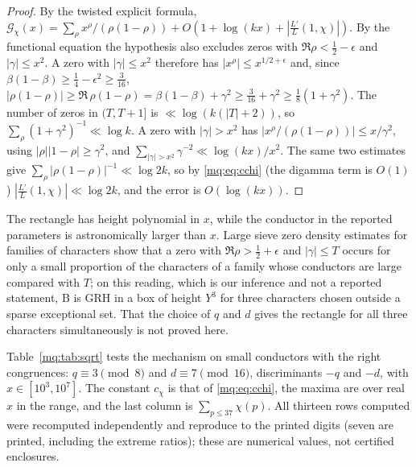 \begin{proof}
By the twisted explicit formula, $\mathcal G_\chi(x)=\sum_{\rho}x^\rho/(\rho(1-\rho))+O(1+\log(kx)+|\frac{L'}L(1,\chi)|)$. By the functional equation the hypothesis also excludes zeros with $\Re\rho<\frac12-\epsilon$ and $|\gamma|\le x^2$. A zero with $|\gamma|\le x^2$ therefore has $|x^\rho|\le x^{1/2+\epsilon}$ and, since $\beta(1-\beta)\ge\frac14-\epsilon^2\ge\frac3{16}$, $|\rho(1-\rho)|\ge\Re\,\rho(1-\rho)=\beta(1-\beta)+\gamma^2\ge\frac3{16}+\gamma^2\ge\frac18(1+\gamma^2)$. The number of zeros in $(T,T+1]$ is $\ll\log(k(|T|+2))$, so $\sum_\rho(1+\gamma^2)^{-1}\ll\log k$. A zero with $|\gamma|>x^2$ has $|x^\rho/(\rho(1-\rho))|\le x/\gamma^2$, using $|\rho||1-\rho|\ge\gamma^2$, and $\sum_{|\gamma|>x^2}\gamma^{-2}\ll\log(kx)/x^2$. The same two estimates give $\sum_\rho|\rho(1-\rho)|^{-1}\ll\log2k$, so by \eqref{mq:eq:cchi} (the digamma term is $O(1)$) $|\frac{L'}L(1,\chi)|\ll\log2k$, and the error is $O(\log(kx))$.
\end{proof}

The rectangle has height polynomial in $x$, while the conductor in the reported parameters is astronomically larger than $x$. Large sieve zero density estimates for families of characters show that a zero with $\Re\rho>\frac12+\epsilon$ and $|\gamma|\le T$ occurs for only a small proportion of the characters of a family whose conductors are large compared with $T$; on this reading, which is our inference and not a reported statement, B is GRH in a box of height $Y^3$ for three characters chosen outside a sparse exceptional set. That the choice of $q$ and $d$ gives the rectangle for all three characters simultaneously is not proved here.

Table~\ref{mq:tab:sqrt} tests the mechanism on small conductors with the right congruences: $q\equiv3\pmod 8$ and $d\equiv7\pmod{16}$, discriminants $-q$ and $-d$, with $x\in[10^3,10^7]$. The constant $c_\chi$ is that of \eqref{mq:eq:cchi}, the maxima are over real $x$ in the range, and the last column is $\sum_{p\le37}\chi(p)$. All thirteen rows computed were recomputed independently and reproduce to the printed digits (seven are printed, including the extreme ratios); these are numerical values, not certified enclosures.

